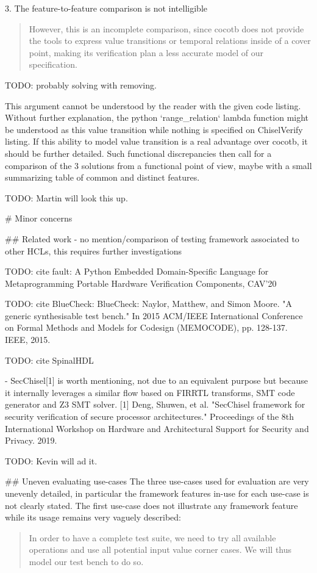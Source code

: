 \documentclass{article}
\newcommand{\todo}[1]{{\color{olive} TODO: #1}}
\begin{document}
3. The feature-to-feature comparison is not intelligible 
\begin{quote}
However, this is
an incomplete comparison, since cocotb does not provide the
tools to express value transitions or temporal relations inside
of a cover point, making its verification plan a less accurate
model of our specification. 
\end{quote}


\todo{probably solving with removing.}

This argument cannot be understood by the reader with the given code listing.
Without further explanation, the python `range\_relation` lambda function might be understood as this value transition while nothing is specified on ChiselVerify listing.
If this ability to model value transition is a real advantage over cocotb, it should be further detailed.
Such functional discrepancies then call for a comparison of the 3 solutions from a functional point of view, maybe with a small summarizing table of common and distinct features.

\todo{Martin will look this up.}

\# Minor concerns

\#\# Related work
- no mention/comparison of testing framework associated to other HCLs, this requires further investigations

\todo{cite fault: A Python Embedded Domain-Specific Language for Metaprogramming Portable Hardware Verification Components, CAV'20}

\todo{cite BlueCheck: BlueCheck: Naylor, Matthew, and Simon Moore. "A generic synthesisable test bench." In 2015 ACM/IEEE International Conference on Formal Methods and Models for Codesign (MEMOCODE), pp. 128-137. IEEE, 2015.}

\todo{cite SpinalHDL}

- SecChisel[1] is worth mentioning, not due to an equivalent purpose but because it internally leverages a similar flow based on FIRRTL transforms, SMT code generator and Z3 SMT solver.
[1] Deng, Shuwen, et al. "SecChisel framework for security verification of secure processor architectures." Proceedings of the 8th International Workshop on Hardware and Architectural Support for Security and Privacy. 2019.

\todo{Kevin will ad it.}

\#\# Uneven evaluating use-cases
The three use-cases used for evaluation are very unevenly detailed, in particular the framework features in-use for each use-case is not clearly stated.
The first use-case does not illustrate any framework feature while its usage remains very vaguely described:
\begin{quote}
In order to have a complete test suite,
we need to try all available operations and use all potential
input value corner cases. We will thus model our test bench
to do so.  
\end{quote}
\end{document}
